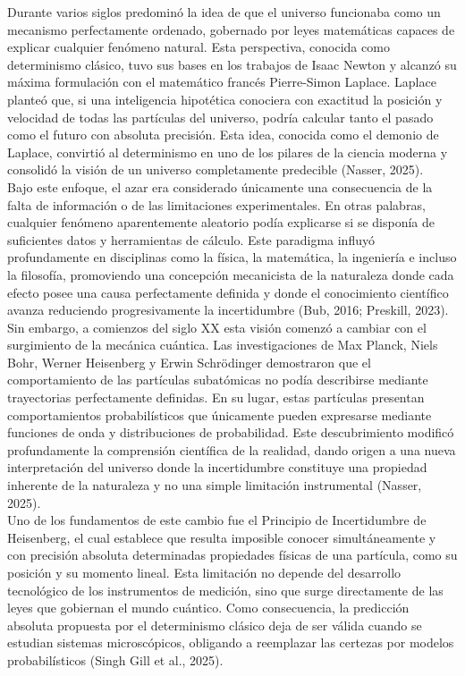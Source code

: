 \documentclass[12pt,a4paper]{article}
\begin{document}
Durante varios siglos predominó la idea de que el universo funcionaba como un mecanismo perfectamente ordenado, gobernado por leyes matemáticas capaces de explicar cual\-quier fenómeno natural. Esta perspectiva, conocida como determinismo clásico, tuvo sus bases en los trabajos de Isaac Newton y alcanzó su máxima formulación con el matemático francés Pierre-Simon Laplace. Laplace planteó que, si una inteligencia hipotética conociera con exactitud la posición y velocidad de todas las partículas del universo, podría calcular tanto el pasado como el futuro con absoluta precisión. Esta idea, conocida como el demonio de Laplace, convirtió al determinismo en uno de los pilares de la ciencia moderna y consolidó la visión de un universo completamente predecible (Nasser, 2025).\\

Bajo este enfoque, el azar era considerado únicamente una consecuencia de la falta de información o de las limitaciones experimentales. En otras palabras, cualquier fenómeno aparentemente aleatorio podía explicarse si se disponía de suficientes datos y herramientas de cálculo. Este paradigma influyó profundamente en disciplinas como la física, la matemática, la ingeniería e incluso la filosofía, promoviendo una concepción mecanicista de la naturaleza donde cada efecto posee una causa perfectamente definida y donde el conocimiento científico avanza reduciendo progresivamente la incertidumbre (Bub, 2016; Preskill, 2023).\\

Sin embargo, a comienzos del siglo XX esta visión comenzó a cambiar con el surgimiento de la mecánica cuántica. Las investigaciones de Max Planck, Niels Bohr, Werner Heisenberg y Erwin Schrödinger demostraron que el comportamiento de las partículas subatómicas no podía describirse mediante trayectorias perfectamente definidas. En su lugar, estas partículas presentan comportamientos probabilísticos que únicamente pueden expresarse mediante funciones de onda y distribuciones de probabilidad. Este descubrimiento modificó profundamente la comprensión científica de la realidad, dando origen a una nueva interpretación del universo donde la incertidumbre constituye una propiedad inherente de la naturaleza y no una simple limitación instrumental (Nasser, 2025).\\

Uno de los fundamentos de este cambio fue el Principio de Incertidumbre de Heisenberg, el cual establece que resulta imposible conocer simultáneamente y con precisión absoluta determinadas propiedades físicas de una partícula, como su posición y su momento lineal. Esta limitación no depende del desarrollo tecnológico de los instrumentos de medición, sino que surge directamente de las leyes que gobiernan el mundo cuántico. Como consecuencia, la predicción absoluta propuesta por el determinismo clásico deja de ser válida cuando se estudian sistemas microscópicos, obligando a reemplazar las certezas por modelos probabilísticos (Singh Gill et al., 2025).\\
\end{document}
